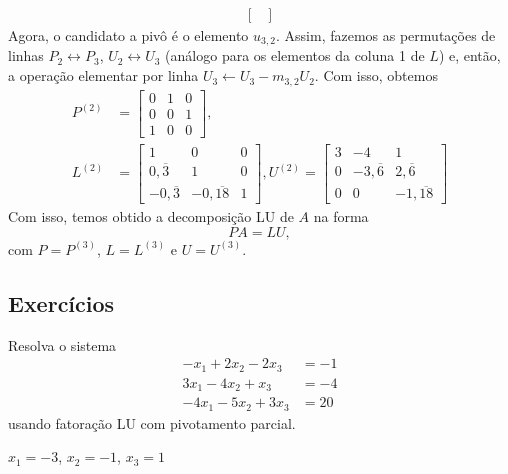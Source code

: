 \begin{ex}
\begin{align}
\begin{bmatrix}
    \end{bmatrix}
  \end{align}
  Agora, o candidato a pivô é o elemento $u_{3,2}$. Assim, fazemos as permutações de linhas $P_2\leftrightarrow P_3$, $U_2 \leftrightarrow U_3$ (análogo para os elementos da coluna 1 de $L$) e, então, a operação elementar por linha $U_3\leftarrow U_3 - m_{3,2}U_2$. Com isso, obtemos
  \begin{align}
    P^{(2)} &=
    \begin{bmatrix}
      0 & 1 & 0\\
      0 & 0 & 1\\
      1 & 0 & 0
    \end{bmatrix},\\
    L^{(2)} &=
    \begin{bmatrix}
      1 & 0 & 0\\
      0,\overline{3} & 1 & 0\\
      -0,\overline{3} & -0,\overline{18} & 1      
    \end{bmatrix},
    U^{(2)} = 
    \begin{bmatrix}
      3 & -4 & 1\\
      0 & -3,\overline{6} & 2,\overline{6}\\
      0 & 0 & -1,\overline{18}
    \end{bmatrix}
  \end{align}
  Com isso, temos obtido a decomposição LU de $A$ na forma
  \begin{equation}
    PA = LU,
  \end{equation}
  com $P=P^{(3)}$, $L=L^{(3)}$ e $U=U^{(3)}$.

% 
\end{ex}

\subsection*{Exercícios}

\begin{exer}\label{exer:lup_sol}
  Resolva o sistema
  \begin{align}
    -x_1 + 2x_2 - 2x_3 &= -1\\
    3x_1 - 4x_2 + x_3 &= -4\\
    -4x_1 - 5x_2 + 3x_3 &= 20
  \end{align}
  usando fatoração LU com pivotamento parcial.
\end{exer}
\begin{resp}
  $x_1 = -3$, $x_2=-1$, $x_3 = 1$
\end{resp}
